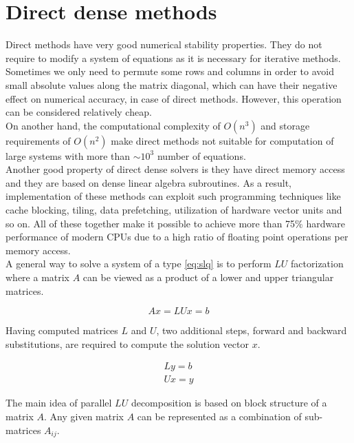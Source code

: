 \section{Direct dense methods} \label{subseq:direct methods}


Direct methods have very good numerical stability properties. They do not require to modify a system of equations as it is necessary for iterative methods. Sometimes we only need to permute some rows and columns in order to avoid small absolute values along the matrix diagonal, which can have their negative effect on numerical accuracy, in case of direct methods. However, this operation can be considered relatively cheap. \\

On another hand, the computational complexity of $O(n^3)$ and storage requirements of $O(n^2)$ make direct methods not suitable for computation of large systems with more than $\sim 10^3$ number of equations. \\


Another good property of direct dense solvers is they have direct memory access and they are based on dense linear algebra subroutines. As a result, implementation of these methods can exploit such programming techniques like cache blocking, tiling, data prefetching,  utilization of hardware vector units and so on. All of these together make it possible to achieve more than 75\% hardware performance of modern CPUs \cite{articles:blas-performance} due to a high ratio of floating point operations per memory access. \\

A general way to solve a system of a type \ref{eq:slq} is to perform $LU$ factorization where a matrix $A$ can be viewed as a product of a lower and upper triangular matrices. 

\begin{equation} \label{eq:lu}
	Ax = LUx = b
\end{equation}

Having computed matrices $L$ and $U$, two additional steps, forward and backward substitutions, are required to compute the solution vector $x$.

\begin{align} \label{eq:bk}
	Ly = b \\
	Ux = y
\end{align}

The main idea of parallel $LU$ decomposition is based on block structure of a matrix $A$. Any given matrix $A$ can be represented as a combination of sub-matrices $A_{ij}$.


